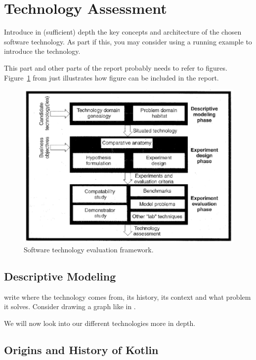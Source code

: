 \section{Technology Assessment}
\label{sec:technology}



Introduce in (sufficient) depth the key concepts and architecture of the chosen software technology. As part if this, you may consider using a running example to introduce the technology.

This part and other parts of the report probably needs to refer to
figures. Figure~\ref{fig:framework} from \cite{brown:96} just
illustrates how figure can be included in the report.

\begin{figure}[thb]
	\centering
	\includegraphics[scale=0.5]{figs/framework.png}
	\caption{Software technology evaluation framework.}
	\label{fig:framework}
\end{figure}

\subsection{Descriptive Modeling}

write where the technology comes from, its history, its context and what problem it solves.
Consider drawing a graph like in \cite{brown:96}.

We will now look into our different technologies more in depth.

\subsection{Origins and History of Kotlin}

